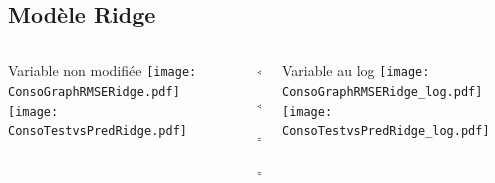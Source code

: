 \documentclass[8pt,aspectratio=169,hyperref={unicode=true}]{beamer}
\begin{document}
\subsection{Modèle Ridge}
\begin{frame}{\insertsubsection}
  \begin{columns}[t]
    \begin{column}{.31\textwidth}
      \centering Variable non modifiée
      \texttt{[image: ConsoGraphRMSERidge.pdf]}
      \texttt{[image: ConsoTestvsPredRidge.pdf]}
    \end{column}
    \begin{column}{.38\textwidth}
      $\Longleftarrow$

      \scriptsize
      {\centering
        }
      

      \normalsize
      $\Longleftarrow$

      \raggedleft $\Longrightarrow$

      \scriptsize
      {\centering
        }
      

      \normalsize
      $\Longrightarrow$
    \end{column}
    \begin{column}{.31\textwidth}
      \centering Variable au log
      \texttt{[image: ConsoGraphRMSERidge\_log.pdf]}
      \texttt{[image: ConsoTestvsPredRidge\_log.pdf]}
    \end{column}
  \end{columns}
\end{frame}
\end{document}
